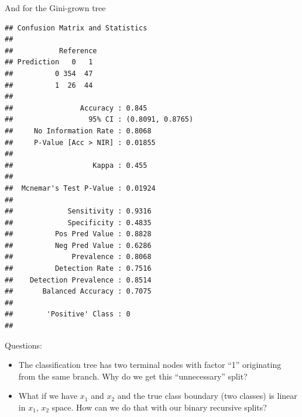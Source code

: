 \documentclass[10pt,ignorenonframetext,]{beamer}
\newenvironment{Shaded}{\begin{snugshade}}{\end{snugshade}}
\newcommand{\KeywordTok}[1]{\textcolor[rgb]{0.13,0.29,0.53}{\textbf{#1}}}
\newcommand{\DataTypeTok}[1]{\textcolor[rgb]{0.13,0.29,0.53}{#1}}
\newcommand{\StringTok}[1]{\textcolor[rgb]{0.31,0.60,0.02}{#1}}
\newcommand{\OperatorTok}[1]{\textcolor[rgb]{0.81,0.36,0.00}{\textbf{#1}}}
\newcommand{\NormalTok}[1]{#1}
\providecommand{\tightlist}{%
  \setlength{\itemsep}{0pt}\setlength{\parskip}{0pt}}
\begin{document}
\begin{frame}[fragile]

And for the Gini-grown tree

\tiny

\begin{Shaded}
\end{Shaded}

\begin{verbatim}
## Confusion Matrix and Statistics
## 
##           Reference
## Prediction   0   1
##          0 354  47
##          1  26  44
##                                           
##                Accuracy : 0.845           
##                  95% CI : (0.8091, 0.8765)
##     No Information Rate : 0.8068          
##     P-Value [Acc > NIR] : 0.01855         
##                                           
##                   Kappa : 0.455           
##                                           
##  Mcnemar's Test P-Value : 0.01924         
##                                           
##             Sensitivity : 0.9316          
##             Specificity : 0.4835          
##          Pos Pred Value : 0.8828          
##          Neg Pred Value : 0.6286          
##              Prevalence : 0.8068          
##          Detection Rate : 0.7516          
##    Detection Prevalence : 0.8514          
##       Balanced Accuracy : 0.7075          
##                                           
##        'Positive' Class : 0               
## 
\end{verbatim}

\end{frame}

\begin{frame}

\begin{block}{Questions:}

\begin{itemize}
\tightlist
\item
  The classification tree has two terminal nodes with factor ``1''
  originating from the same branch. Why do we get this ``unnecessary''
  split?
\item
  What if we have \(x_1\) and \(x_2\) and the true class boundary (two
  classes) is linear in \(x_1\), \(x_2\) space. How can we do that with
  our binary recursive splits?
\end{itemize}

\end{block}

\end{frame}
\end{document}
